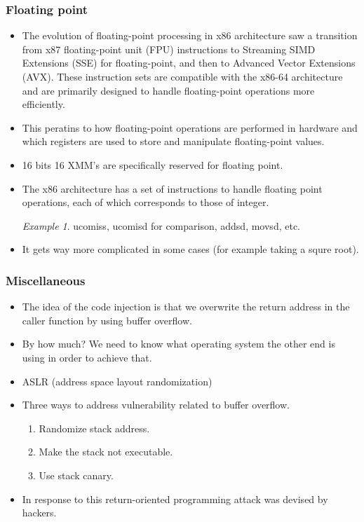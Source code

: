 \documentclass[11pt,reqno]{amsart}
\theoremstyle{remark}
\newtheorem{example}{Example}
\begin{document}
\subsubsection*{Floating point}
\begin{itemize}
\item The evolution of floating-point processing in x86 architecture 
saw a transition from x87 floating-point unit (FPU) instructions to Streaming 
SIMD Extensions (SSE) for floating-point, and then to Advanced Vector Extensions
 (AVX). These instruction sets are compatible with the x86-64 architecture 
 and are primarily designed to handle floating-point operations more efficiently.
\item This peratins to how floating-point operations are performed in hardware and 
which registers are used to store and manipulate floating-point values.
\item 16 bits 16 XMM's are specifically reserved for floating point.
\item The x86 architecture has a set of instructions to handle floating 
point operations, each of which corresponds to those of integer.
\begin{example}
ucomiss, ucomisd for comparison, addsd, movsd, etc.
\end{example}
\item It gets way more complicated in some cases (for example taking a squre root).
\end{itemize}
\subsubsection*{Miscellaneous}
\begin{itemize}
\item The idea of the code injection is that we 
overwrite the return address in the caller function 
by using buffer overflow.
\item By how much? We need to know what operating system
 the other end is using in order to achieve that.
\item ASLR (address space layout randomization)
\item Three ways to address vulnerability related to 
buffer overflow.
\begin{enumerate}
\item Randomize stack address.
\item Make the stack not executable.
\item Use stack canary.
\end{enumerate}
\item In response to this return-oriented programming 
attack was devised by hackers.
\end{itemize}
\end{document}

